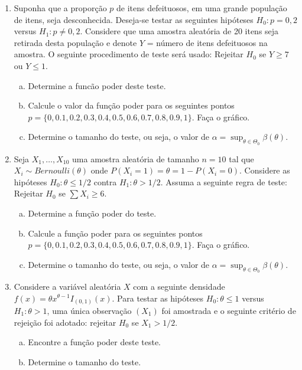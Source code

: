 \documentclass[10pt,brazil,addpoints]{exam}
\begin{document}
\begin{enumerate}[1.]
\item Suponha que a proporção $p$ de itens defeituosos, em uma grande população de itens, seja desconhecida. Deseja-se testar as seguintes hipóteses $H_0 : p = 0,2$ versus $H_1 : p \neq 0,2$. Considere que uma amostra aleatória de 20 itens seja retirada desta população e denote $Y$ = número de itens defeituosos na amostra. O seguinte procedimento de teste será usado: Rejeitar $H_0$ se $Y \geq 7$ ou $Y \leq 1$.

\begin{enumerate}[a)]
\item Determine a funcão poder deste teste.
 
 \item Calcule o valor da função poder para os seguintes pontos $p = \{0, 0.1, 0.2, 0.3, 0.4, 0.5, 0.6, 0.7, 0.8, 0.9, 1\}$. Faça o gráfico.
 
 \item Determine o tamanho do teste, ou seja, o valor de $\alpha = \sup_{\theta \in\Theta_0} \beta(\theta)$.
\end{enumerate}

\item Seja $X_1, \ldots, X_{10} $ uma amostra aleatória de tamanho $n = 10$ tal que $X_i \sim Bernoulli(\theta)$ onde $P(X_i = 1) = \theta = 1 - P(X_i = 0)$. Considere as hipóteses $H_0 : \theta \leq 1/2$ contra $H_1 : \theta > 1/2$. Assuma a seguinte regra de teste: Rejeitar $H_0$ se $\sum X_i \geq 6$.


\begin{enumerate}[a)]
 \item Determine a função poder do teste.
 \item Calcule a função poder para os seguintes pontos $p = \{0, 0.1, 0.2, 0.3, 0.4, 0.5, 0.6, 0.7, 0.8, 0.9, 1\}$. Faça o gráfico.
 \item Determine o tamanho do teste, ou seja, o valor de $\alpha = \sup_{\theta \in\Theta_0} \beta(\theta)$.
\end{enumerate}

\item Considere a variável aleatória $X$ com a seguinte densidade $f(x) = \theta x^{\theta-1}I_{(0,1)}(x)$. Para testar as hipóteses $H_0 : \theta \leq 1$ versus $H_1: \theta > 1$, uma única observação $(X_1)$ foi amostrada e o seguinte critério de rejeição foi adotado: rejeitar $H_0$ se $X_1 > 1/2$.

\begin{enumerate}[a)]
 \item Encontre a função poder deste teste.
 \item Determine o tamanho do teste.
\end{enumerate}



\end{enumerate}
\end{document}
